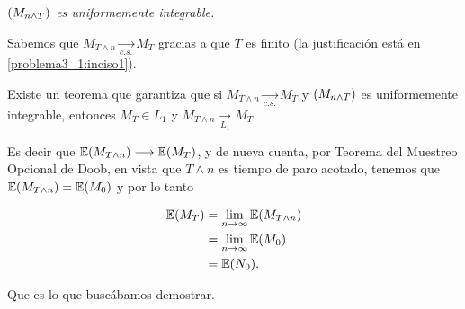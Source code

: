 \emph{
    $\left( M_{n\wedge T}\right) $ es uniformemente integrable. 
}

Sabemos que $M_{T \wedge n} \underset{c.s.}\longrightarrow M_T$ gracias a que $T$ es finito 
(la justificación está en \ref{problema3_1:inciso1}).\par\null

Existe un teorema que garantiza que si $M_{T \wedge n} \underset{c.s.}\longrightarrow M_T$ y 
$\left( M_{n\wedge T}\right) $ es uniformemente integrable, entonces 
$M_T \in L_1$ y $M_{T \wedge n} \underset{L_1}\longrightarrow M_T$.\par\null

Es decir que $\mathbb{E}(M_{T \wedge n}) \longrightarrow \mathbb{E}(M_T)$, y de nueva cuenta, por Teorema del Muestreo Opcional de Doob, 
en vista que $T \wedge n$ es tiempo de paro acotado, tenemos que $\mathbb{E}(M_{T \wedge n}) = \mathbb{E}(M_0)$ y por lo tanto

\begin{align}
    \mathbb{E}(M_T)     &=  \lim_{n \rightarrow \infty} \mathbb{E}(M_{T \wedge n})      \\
                &=  \lim_{n \rightarrow \infty} \mathbb{E}(M_0)                 \\
                &=  \mathbb{E}(N_0).
\end{align}\par\null

Que es lo que buscábamos demostrar.
